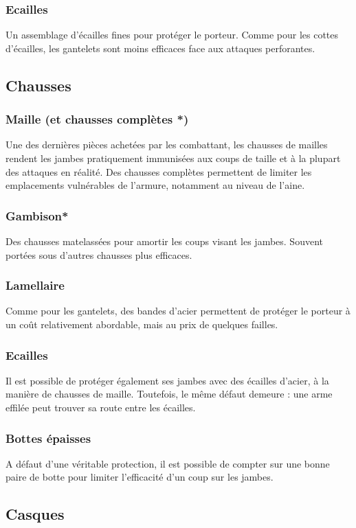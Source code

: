 \documentclass[10pt,a4paper,twocolumn]{book}
\begin{document}
\subsubsection{Ecailles}
Un assemblage d'écailles fines pour protéger le porteur. Comme pour les cottes d'écailles, les gantelets sont moins efficaces face aux attaques perforantes.
\subsection{Chausses}
\subsubsection{Maille (et chausses complètes *)}
Une des dernières pièces achetées par les combattant, les chausses de mailles rendent les jambes pratiquement immunisées aux coups de taille et à la plupart des attaques en réalité. Des chausses complètes permettent de limiter les emplacements vulnérables de l'armure, notamment au niveau de l'aine.
\subsubsection{Gambison*}
Des chausses matelassées pour amortir les coups visant les jambes. Souvent portées sous d'autres chausses plus efficaces.
\subsubsection{Lamellaire}
Comme pour les gantelets, des bandes d'acier permettent de protéger le porteur à un coût relativement abordable, mais au prix de quelques failles.
\subsubsection{Ecailles}
Il est possible de protéger également ses jambes avec des écailles d'acier, à la manière de chausses de maille. Toutefois, le même défaut demeure : une arme effilée peut trouver sa route entre les écailles.
\subsubsection{Bottes épaisses}
A défaut d'une véritable protection, il est possible de compter sur une bonne paire de botte pour limiter l'efficacité d'un coup sur les jambes.

\subsection{Casques}
\end{document}

